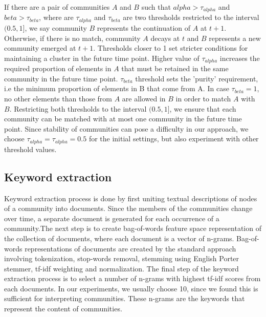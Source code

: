 \documentclass{article} %
\begin{document}
If there are a pair of communities $A$ and $B$ such that $alpha > \tau_{alpha}$ and $beta > \tau_{beta}$, where are $\tau_{alpha}$ and $\tau_{beta}$ are two thresholds restricted to the interval $(0.5, 1]$, we say community $B$ represents the continuation of $A$ at $t+1$. Otherwise, if there is no match, community $A$ decays at $t$ and $B$ represents a new community emerged at $t+1$. Thresholds closer to 1 set stricter conditions for maintaining a cluster in the future time point. Higher value of $\tau_{alpha}$ increases the required proportion of elements in $A$ that must be retained in the same community in the future time point. $\tau_{beta}$ threshold sets the 'purity' requirement, i.e the minimum proportion of elements in B that come from A. In case $\tau_{beta} = 1$, no other elements than those from $A$ are allowed in $B$ in order to match $A$ with $B$. Restricting both thresholds to the interval $(0.5, 1]$, we ensure that each community can be matched with at most one community in the future time point. Since stability of communities can pose a difficulty in our approach, we choose $\tau_{alpha} = \tau_{alpha} = 0.5$ for the initial settings, but also experiment with other threshold values.

\subsection{Keyword extraction}
Keyword extraction process is done by first uniting textual descriptions of nodes of a community into documents. Since the members of the communities change over time, a separate document is generated for each occurrence of a community.The next step is to create bag-of-words feature space representation of the collection of documents, where each document is a vector of n-grams. Bag-of-words representations of documents are created by the standard approach involving tokenization, stop-words removal, stemming using English Porter stemmer, tf-idf weighting and normalization. The final step of the keyword extraction process is to select a number of n-grams with highest tf-idf scores from each documents.  In our experiments, we usually choose 10, since we found this is sufficient for interpreting communities. These n-grams are the keywords that represent the content of communities.
\end{document}
